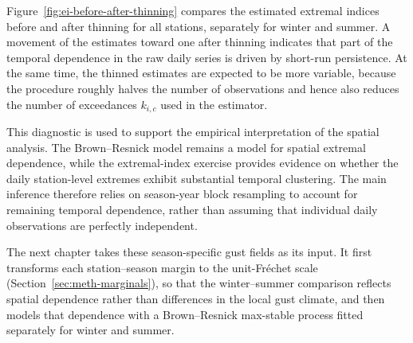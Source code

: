 Figure~\ref{fig:ei-before-after-thinning} compares the estimated extremal indices before and after thinning for all stations, separately for winter and summer. A movement of the estimates toward one after thinning indicates that part of the temporal dependence in the raw daily series is driven by short-run persistence. At the same time, the thinned estimates are expected to be more variable, because the procedure roughly halves the number of observations and hence also reduces the number of exceedances \(k_{i,c}\) used in the estimator.

This diagnostic is used to support the empirical interpretation of the spatial analysis. The Brown--Resnick model remains a model for spatial extremal dependence, while the extremal-index exercise provides evidence on whether the daily station-level extremes exhibit substantial temporal clustering. The main inference therefore relies on season-year block resampling to account for remaining temporal dependence, rather than assuming that individual daily observations are perfectly independent.

The next chapter takes these season-specific gust fields as its input. It first transforms each station--season margin to the unit-Fr\'echet scale (Section~\ref{sec:meth-marginals}), so that the winter--summer comparison reflects spatial dependence rather than differences in the local gust climate, and then models that dependence with a Brown--Resnick max-stable process fitted separately for winter and summer.